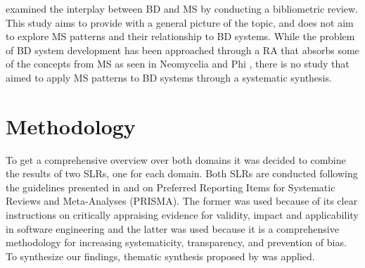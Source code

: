 \documentclass[a4paper,11pt,article,oneside]{memoir}
\begin{document}

\citet{staegemann2021examining} examined the interplay between BD and MS by conducting a bibliometric review. This study aims to provide with a general picture of the topic, and does not aim to explore MS patterns and their relationship to BD systems.  While the problem of BD system development has been approached through a RA that absorbs some of the concepts from MS as seen in Neomycelia \citep{ataei2021neomycelia} and Phi \citep{maamouri2021phi}, there is no study that aimed to apply MS patterns to BD systems through a systematic synthesis.


\chapter{Methodology}

To get a comprehensive overview over both domains it was decided to combine the results of two SLRs, one for each domain. Both SLRs are conducted following the guidelines presented in \citet{Kitchenham.2004} and \citet{page2021prisma} on Preferred Reporting Items for Systematic Reviews and Meta-Analyses (PRISMA). The former was used because of its clear instructions on critically appraising evidence for validity, impact and applicability in software engineering and the latter was used because it is a comprehensive methodology for increasing systematicity, transparency, and prevention of bias. To synthesize our findings, thematic synthesis proposed by \citet{Cruzes.2011} was applied. 





\end{document}

